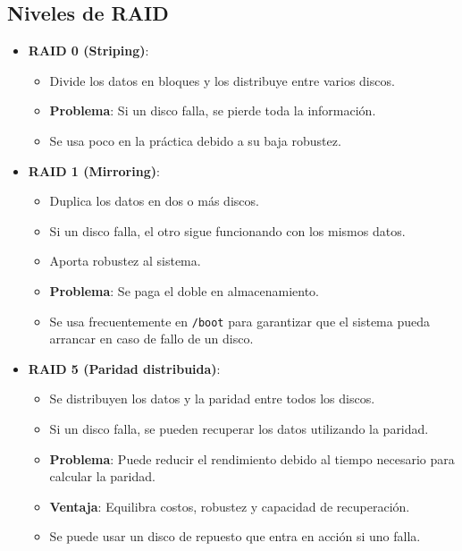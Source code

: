 \subsection{Niveles de RAID}
\begin{itemize}
    \item \textbf{RAID 0 (Striping)}:
    \begin{itemize}
        \item Divide los datos en bloques y los distribuye entre varios discos.
        \item \textbf{Problema}: Si un disco falla, se pierde toda la información.
        \item Se usa poco en la práctica debido a su baja robustez.
    \end{itemize}
    
    \item \textbf{RAID 1 (Mirroring)}:
    \begin{itemize}
        \item Duplica los datos en dos o más discos.
        \item Si un disco falla, el otro sigue funcionando con los mismos datos.
        \item Aporta robustez al sistema.
        \item \textbf{Problema}: Se paga el doble en almacenamiento.
        \item Se usa frecuentemente en \texttt{/boot} para garantizar que el sistema pueda arrancar en caso de fallo de un disco.
    \end{itemize}
    
    \item \textbf{RAID 5 (Paridad distribuida)}:
    \begin{itemize}
        \item Se distribuyen los datos y la paridad entre todos los discos.
        \item Si un disco falla, se pueden recuperar los datos utilizando la paridad.
        \item \textbf{Problema}: Puede reducir el rendimiento debido al tiempo necesario para calcular la paridad.
        \item \textbf{Ventaja}: Equilibra costos, robustez y capacidad de recuperación.
        \item Se puede usar un disco de repuesto que entra en acción si uno falla.
    \end{itemize}
\end{itemize}

